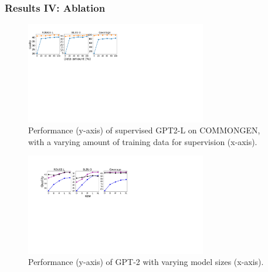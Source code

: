 \documentclass[10pt,aspectratio=43]{beamer}
\begin{document}
    \begin{frame}
        \frametitle{\textbf{Results IV: Ablation}}
        \begin{figure}[!t]
            \centering
            \includegraphics[width=3.1in]{figures/results4.pdf}
            \caption{Performance (y-axis) of supervised GPT2-L on C{\scriptsize OMMON}G{\scriptsize EN}, with a varying amount of training data for supervision (x-axis).}
            \label{fig:results4}
        \end{figure}
        \begin{figure}[!t]
            \centering
            \includegraphics[width=3.1in]{figures/results5.pdf}
            \caption{Performance (y-axis) of GPT-2 with varying model sizes (x-axis).}
            \label{fig:results5}
        \end{figure}
    \end{frame}
    
\end{document}
